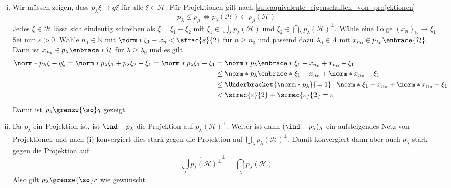 \begin{beweis}
	\leavevmode
	\begin{enumerate}[(i)]
		\item Wir müssen zeigen, dass $p_\lambda \xi\to q \xi$ für alle $\xi \in \mathcal{H}$.
		Für Projektionen gilt nach \cref{sub:aquivalente_eigenschaften_von_projektionen}
		\[
			p_\lambda \le p_\mu \iff p_\lambda(\mathcal{H}) \subset p_\mu(\mathcal{H})
		\]
		Jedes $\xi \in \mathcal{H}$ lässt sich eindeutig schreiben als $\xi=\xi_1 + \xi_2$ mit $\xi_1 \in \overline{\bigcup_\lambda p_\lambda(\mathcal{H})}$ und $\xi_2 \in \bigcap_\lambda p_\lambda(\mathcal{H})^\bot$.
		Wähle eine Folge $(x_n)_\mathbb{N} \to \xi_1$.
		Sei nun $\varepsilon>0$. Wähle $n_0 \in \mathbb{N}$ mit $\norm*{\xi_1-x_n}< \sfrac{\varepsilon}{2}$ für $n\ge n_0$ und passend dazu $\lambda_0 \in \Lambda$ mit $x_{n_0} \in p_{\lambda_0}\enbrace{\mathcal{H}}$.
		Dann ist $x_{n_0} \in p_\lambda \enbrace*{\mathcal{H}}$ für $\lambda\ge \lambda_0$ und es gilt
		\begin{align}
			\norm*{p_\lambda \xi -q \xi} = \norm*{p_\lambda \xi_1 + p_\lambda \xi_2 - \xi_1} = \norm*{p_\lambda \xi_1 - \xi_1} &= \norm*{p_\lambda \enbrace*{\xi_1 - x_{n_0} + x_{n_0}} - \xi_1} \\
			&\le \norm*{p_\lambda \enbrace*{\xi_1 - x_{n_0}}} + \norm*{x_{n_0} - \xi_1} \\
			&\le \Underbracket{\norm*{p_\lambda}}{=1} \cdot \norm*{\xi_1 - x_{n_0}} + \norm*{x_{n_0} - \xi_1} \\
			&< \sfrac{\varepsilon}{2} + \sfrac{\varepsilon}{2} = \varepsilon
		\end{align}
		Damit ist $p_\lambda \grenzw{\so} q$ gezeigt.
		\item Da $p_\lambda$ ein Projektion ist, ist $\ind - p_\lambda$ die Projektion auf $p_\lambda(\mathcal{H})^\bot$.
		Weiter ist dann $(\ind - p_\lambda)_\Lambda$ ein aufsteigendes Netz von Projektionen und nach (i) konvergiert dies stark gegen die Projektion auf $\overline{\bigcup_\lambda p_\lambda(\mathcal{H})^\bot}$.
		Damit konvergiert dann aber auch $p_\lambda$ stark gegen die Projektion auf
		\[
			\overline{\bigcup_\lambda p_\lambda(\mathcal{H})^\bot}^\bot = \bigcap_\lambda p_\lambda(\mathcal{H})
		\]
		Also gilt $p_\lambda \grenzw{\so} r$ wie gewünscht.\qedhere
	\end{enumerate}
\end{beweis}

